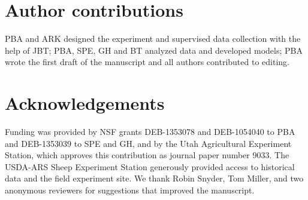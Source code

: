 \documentclass[11pt]{article}
\begin{document}
\begin{doublespacing}
%

\section*{Author contributions}
PBA and ARK designed the experiment and supervised data collection with the help of JBT; PBA, SPE, GH and BT analyzed data and 
developed models; PBA wrote the first draft of the manuscript and all authors contributed to editing.

\section*{Acknowledgements}
Funding was provided by NSF grants DEB-1353078 and DEB-1054040 to PBA and DEB-1353039 to SPE and GH, and 
by the Utah Agricultural Experiment Station, which approves this contribution as journal paper number 9033. 
The USDA-ARS Sheep Experiment Station generously provided access to historical data and the field experiment site. 
We thank Robin Snyder, Tom Miller, and two anonymous reviewers for suggestions that improved the manuscript.

\newpage
\renewcommand{\refname}{Literature cited}



\end{doublespacing} 
\end{document}
